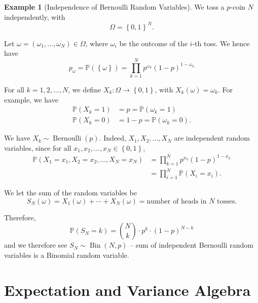 \documentclass[11pt]{article}
\numberwithin{equation}{section}
\theoremstyle{definition}
\newtheorem{example}[theorem]{Example}
\theoremstyle{remark}
\newcommand{\pqty}[1]{\left(#1\right)}
\newcommand{\Bqty}[1]{\left\{#1\right\}}
\newcommand{\functiondomain}[3]{#1:#2\to #3}
\newcommand{\Prob}{\mathbb P}
\newcommand{\Bernoulli}{\operatorname{Bernoulli}}
\newcommand{\Binomial}{\operatorname{Bin}}
\begin{document}
\begin{example}[Independence of Bernoulli Random Variables]\label{probability-example-019}
    \label{probability-ex:independence-bernoulli}
    We toss a \(p\)-coin \(N\) independently, with
    \[
        \Omega = \Bqty{0, 1}^N.
    \]

    Let \(\omega = \pqty{\omega_1, \ldots, \omega_N} \in \Omega\), where \(\omega_i\) be the outcome of the \(i\)-th toss. We hence have
    \[
        p_\omega = \Prob\pqty{\Bqty{\omega}} = \prod_{k = 1}^{N} p^{\omega_k} \pqty{1 - p}^{1 - \omega_k}
    \]

    For all \(k = 1, 2, \ldots, N\), we define \(\functiondomain{X_k}{\Omega}{\Bqty{0, 1}}\), with \(X_k\pqty{\omega} = \omega_k\). For example, we have
    \begin{align*}
        \Prob\pqty{X_k = 1} &= p = \Prob\pqty{\omega_k = 1} \\
        \Prob\pqty{X_k = 0} &= 1 - p = \Prob\pqty{\omega_k = 0}.
    \end{align*}

    We have \(X_k \sim \Bernoulli\pqty{p}\). Indeed, \(X_1, X_2, \ldots, X_N\) are independent random variables, since for all \(x_1, x_2, \ldots, x_N \in \Bqty{0, 1}\),
    \begin{align*}
        \Prob\pqty{X_1 = x_1, X_2 = x_2, \ldots, X_N = x_N} &= \prod_{k = 1}^{N} p^{x_k} \pqty{1 - p}^{1 - x_k} \\
        &= \prod_{i = 1}^{N} \Prob\pqty{X_i = x_i}.
    \end{align*}

    We let the sum of the random variables be
    \[
        S_N\pqty{\omega} = X_1 \pqty{\omega} + \cdots + X_N \pqty{\omega} = \text{number of heads in }N\text{ tosses}.
    \]

    Therefore,
    \[
        \Prob\pqty{S_N = k} = \binom{N}{k} \cdot p^k \cdot \pqty{1 - p}^{N - k}
    \]
    and we therefore see \(S_N \sim \Binomial\pqty{N, p}\) -- sum of independent Bernoulli random variables is a Binomial random variable.
\end{example}

\section{Expectation and Variance Algebra}\label{probability-section-05}
\end{document}
